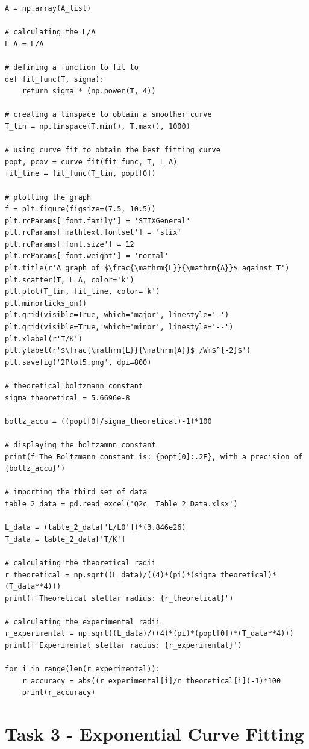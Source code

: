 \documentclass[12pt, a4paper]{article}
\begin{document}
\begin{verbatim}
A = np.array(A_list)

# calculating the L/A
L_A = L/A

# defining a function to fit to
def fit_func(T, sigma):
    return sigma * (np.power(T, 4))

# creating a linspace to obtain a smoother curve
T_lin = np.linspace(T.min(), T.max(), 1000)

# using curve fit to obtain the best fitting curve
popt, pcov = curve_fit(fit_func, T, L_A)
fit_line = fit_func(T_lin, popt[0])

# plotting the graph
f = plt.figure(figsize=(7.5, 10.5))
plt.rcParams['font.family'] = 'STIXGeneral'
plt.rcParams['mathtext.fontset'] = 'stix'
plt.rcParams['font.size'] = 12
plt.rcParams['font.weight'] = 'normal'
plt.title(r'A graph of $\frac{\mathrm{L}}{\mathrm{A}}$ against T')
plt.scatter(T, L_A, color='k')
plt.plot(T_lin, fit_line, color='k')
plt.minorticks_on()
plt.grid(visible=True, which='major', linestyle='-')
plt.grid(visible=True, which='minor', linestyle='--')
plt.xlabel(r'T/K')
plt.ylabel(r'$\frac{\mathrm{L}}{\mathrm{A}}$ /Wm$^{-2}$')
plt.savefig('2Plot5.png', dpi=800)

# theoretical boltzmann constant
sigma_theoretical = 5.6696e-8 

boltz_accu = ((popt[0]/sigma_theoretical)-1)*100

# displaying the boltzamnn constant
print(f'The Boltzmann constant is: {popt[0]:.2E}, with a precision of {boltz_accu}')

# importing the third set of data
table_2_data = pd.read_excel('Q2c__Table_2_Data.xlsx')

L_data = (table_2_data['L/L0'])*(3.846e26)    
T_data = table_2_data['T/K']                              

# calculating the theoretical radii
r_theoretical = np.sqrt((L_data)/((4)*(pi)*(sigma_theoretical)*(T_data**4)))
print(f'Theoretical stellar radius: {r_theoretical}')

# calculating the experimental radii
r_experimental = np.sqrt((L_data)/((4)*(pi)*(popt[0])*(T_data**4)))
print(f'Experimental stellar radius: {r_experimental}')

for i in range(len(r_experimental)):
    r_accuracy = abs((r_experimental[i]/r_theoretical[i])-1)*100
    print(r_accuracy)

\end{verbatim}

\section{Task 3 - Exponential Curve Fitting}
\end{document}
